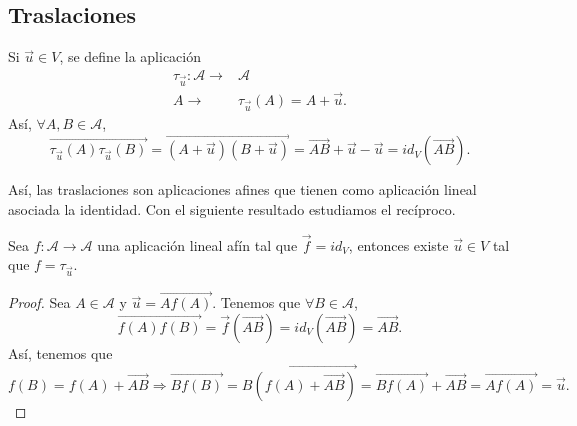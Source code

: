 \subsection{Traslaciones}
Si $\displaystyle \vec{u} \in V $, se define la aplicación
\[
\begin{split}
	\tau_{\vec{u}} : \mathcal{A} \to & \mathcal{A} \\
A \to & \tau_{\vec{u}}\left(A\right) = A +\vec{u}.
\end{split}
\]
Así, $\displaystyle \forall A,B \in \mathcal{A} $,
\[\overrightarrow{\tau_{\vec{u}}\left(A\right)\tau_{\vec{u}}\left(B\right)} = \overrightarrow{\left(A +\vec{u}\right)\left(B + \vec{u}\right)} = \overrightarrow{AB} + \vec{u}-\vec{u} = id _{V}\left(\overrightarrow{AB}\right).\]
\begin{observation}
\normalfont Así, las traslaciones son aplicaciones afines que tienen como aplicación lineal asociada la identidad. Con el siguiente resultado estudiamos el recíproco.
\end{observation}
\begin{ftheorem}[]
\normalfont Sea $\displaystyle f : \mathcal{A} \to \mathcal{A} $ una aplicación lineal afín tal que $\displaystyle \vec{f} = id _{V} $, entonces existe $\displaystyle \vec{u} \in V $ tal que $\displaystyle f = \tau_{\vec{u}} $.
\end{ftheorem}
\begin{proof}
	Sea $\displaystyle A \in \mathcal{A} $ y $\displaystyle \vec{u} = \overrightarrow{Af\left(A\right)} $. Tenemos que $\displaystyle \forall B \in \mathcal{A} $,
	\[\overrightarrow{f\left(A\right)f\left(B\right)} = \vec{f}\left(\overrightarrow{AB}\right)= id _{V}\left(\overrightarrow{AB}\right) = \overrightarrow{AB} .\]
Así, tenemos que 
\[f\left(B\right) = f\left(A\right) + \overrightarrow{AB} \Rightarrow \overrightarrow{Bf\left(B\right)} = \overrightarrow{B\left(f\left(A\right)+\overrightarrow{AB} \right)} = \overrightarrow{Bf\left(A\right)} +\overrightarrow{AB} = \overrightarrow{Af\left(A\right)} =\vec{u} .\]
\end{proof}
